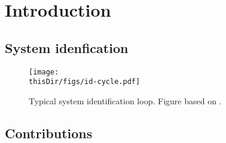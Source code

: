 \chapter{Introduction}
\def\thisDir{ch01-intro}

  \section{System idenfication}

\begin{figure}

  \centering
  \texttt{[image: \\thisDir/figs/id-cycle.pdf]}
  \caption[Identification loop]{Typical system identification loop. Figure based on \citep[Figure 1.10]{Ljung1999}.}
  \label{fig:intro:identification-cycle}
\end{figure}

   \section{Contributions}

